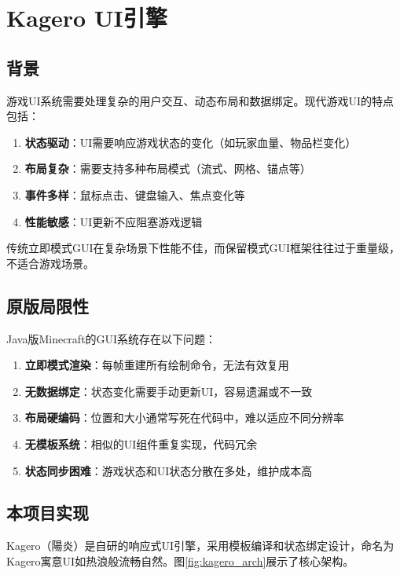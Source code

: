 \section{Kagero UI引擎}
\label{sec:kagero}

\subsection{背景}

游戏UI系统需要处理复杂的用户交互、动态布局和数据绑定。现代游戏UI的特点包括：

\begin{enumerate}
    \item \textbf{状态驱动}：UI需要响应游戏状态的变化（如玩家血量、物品栏变化）
    \item \textbf{布局复杂}：需要支持多种布局模式（流式、网格、锚点等）
    \item \textbf{事件多样}：鼠标点击、键盘输入、焦点变化等
    \item \textbf{性能敏感}：UI更新不应阻塞游戏逻辑
\end{enumerate}

传统立即模式GUI在复杂场景下性能不佳，而保留模式GUI框架往往过于重量级，不适合游戏场景。

\subsection{原版局限性}

Java版Minecraft的GUI系统存在以下问题：

\begin{enumerate}
    \item \textbf{立即模式渲染}：每帧重建所有绘制命令，无法有效复用
    \item \textbf{无数据绑定}：状态变化需要手动更新UI，容易遗漏或不一致
    \item \textbf{布局硬编码}：位置和大小通常写死在代码中，难以适应不同分辨率
    \item \textbf{无模板系统}：相似的UI组件重复实现，代码冗余
    \item \textbf{状态同步困难}：游戏状态和UI状态分散在多处，维护成本高
\end{enumerate}

\subsection{本项目实现}

Kagero（陽炎）是自研的响应式UI引擎，采用模板编译和状态绑定设计，命名为Kagero寓意UI如热浪般流畅自然。图\ref{fig:kagero_arch}展示了核心架构。

